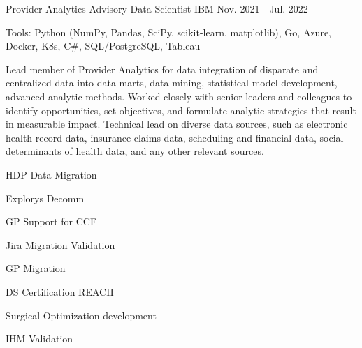 \begin{cventries}
  \cvexpentry
    {Provider Analytics} %
    {Advisory Data Scientist} %
    {IBM}
    {Nov. 2021 - Jul. 2022}
    {
      \begin{cvheavyparagraph}
        Tools: Python (NumPy, Pandas, SciPy, scikit-learn, matplotlib), Go, Azure, Docker, K8s, C\#, SQL/PostgreSQL, Tableau
      \end{cvheavyparagraph}
    }
    {
      \begin{cvparagraph}
        Lead member of Provider Analytics for data integration of disparate and centralized data into data marts, data mining, statistical model development, advanced analytic methods.  Worked closely with senior leaders and colleagues to identify opportunities, set objectives, and formulate analytic strategies that result in measurable impact.  Technical lead on diverse data sources, such as electronic health record data, insurance claims data, scheduling and financial data, social determinants of health data, and any other relevant sources.
      \end{cvparagraph}
      \begin{cvitems}
        \item {HDP Data Migration}
        \item {Explorys Decomm}
        \item {GP Support for CCF}
        \item {Jira Migration Validation}
        \item {GP Migration}
        \item {DS Certification REACH}
        \item {Surgical Optimization development}
        \item {IHM Validation}
      \end{cvitems}
    }


\end{cventries}
